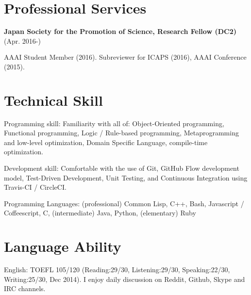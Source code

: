 \documentclass[letterpaper,12pt]{article}
\begin{document}



\section{Professional Services}

\textbf{Japan Society for the Promotion of Science, Research Fellow (DC2)} (Apr. 2016-)

AAAI Student Member (2016).
Subreviewer for ICAPS (2016), AAAI Conference (2015).


\section{Technical Skill}

\begin{CV}
 \item[Programming skill:] Familiarity with all of: 
 Object-Oriented programming,
 Functional programming,
 Logic / Rule-based programming,
 Metaprogramming and low-level optimization,
 Domain Specific Language, compile-time optimization.
 \item[Development skill:] Comfortable with the use of Git,
 GitHub Flow development model, Test-Driven Development, Unit
 Testing, and Continuous Integration using Travis-CI / CircleCI.
 \item[Programming Languages:]
 (professional) Common Lisp, C++, Bash, Javascript / Coffeescript, C,
 (intermediate) Java, Python,
 (elementary)   Ruby
\end{CV}

\section{Language Ability}

\begin{CV}
 \item[English:] TOEFL 105/120 (Reading:29/30, Listening:29/30,
 Speaking:22/30, Writing:25/30, Dec 2014). I enjoy daily discussion
 on Reddit, Github, Skype and IRC channels.
\end{CV}
\end{document}
